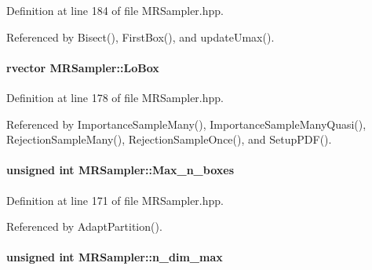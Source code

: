 \-Definition at line 184 of file \-M\-R\-Sampler.\-hpp.



\-Referenced by \-Bisect(), \-First\-Box(), and update\-Umax().

\hypertarget{classMRSampler_a541ae11d9bfc46da67065796901740a4}{
\paragraph[{\-Lo\-Box}]{\setlength{\rightskip}{0pt plus 5cm}rvector {\bf \-M\-R\-Sampler\-::\-Lo\-Box}}}\label{classMRSampler_a541ae11d9bfc46da67065796901740a4}


\-Definition at line 178 of file \-M\-R\-Sampler.\-hpp.



\-Referenced by \-Importance\-Sample\-Many(), \-Importance\-Sample\-Many\-Quasi(), \-Rejection\-Sample\-Many(), \-Rejection\-Sample\-Once(), and \-Setup\-P\-D\-F().

\hypertarget{classMRSampler_adf95f77ac86c63eef71474204ac28efc}{
\paragraph[{\-Max\-\_\-n\-\_\-boxes}]{\setlength{\rightskip}{0pt plus 5cm}unsigned int {\bf \-M\-R\-Sampler\-::\-Max\-\_\-n\-\_\-boxes}}}\label{classMRSampler_adf95f77ac86c63eef71474204ac28efc}


\-Definition at line 171 of file \-M\-R\-Sampler.\-hpp.



\-Referenced by \-Adapt\-Partition().

\hypertarget{classMRSampler_afa30f614f3bf25d89990256e2e0c38bd}{
\paragraph[{n\-\_\-dim\-\_\-max}]{\setlength{\rightskip}{0pt plus 5cm}unsigned int {\bf \-M\-R\-Sampler\-::n\-\_\-dim\-\_\-max}}}\label{classMRSampler_afa30f614f3bf25d89990256e2e0c38bd}


